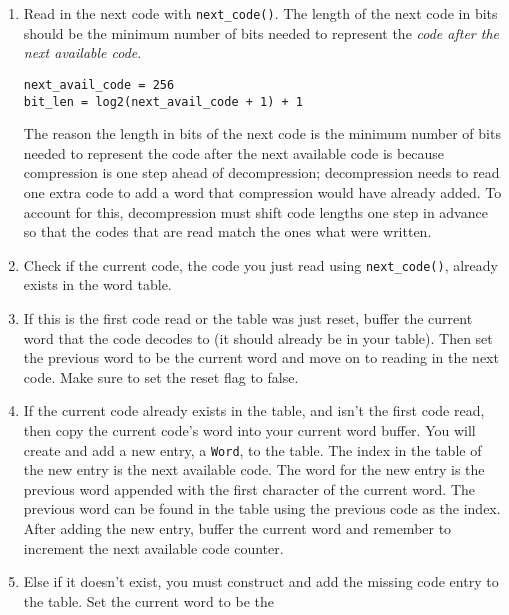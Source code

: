 \documentclass{article}
\begin{document}
\begin{enumerate}
\begin{enumerate}
            \item Read in the next code with \texttt{next\_code()}. The length
                of the next code in bits should be the minimum number of bits
                needed to represent the
                \emph{code after the next available code}.
\begin{lstlisting}
next_avail_code = 256
bit_len = log2(next_avail_code + 1) + 1
\end{lstlisting}
                The reason the length in bits of the next code is the minimum
                number of bits needed to represent the code after the next
                available code is because compression is one step ahead of
                decompression; decompression needs to read one extra code to add
                a word that compression would have already added. To account
                for this, decompression must shift code lengths one step in
                advance so that the codes that are read match the ones what were
                written.
            \item Check if the current code, the code you just read using
                \texttt{next\_code()}, already exists in the word table.
            \item If this is the first code read or the table was just reset,
                buffer the current word that the code decodes to (it should
                already be in your table). Then set the previous word to be the
                current word and move on to reading in the next code. Make sure
                to set the reset flag to false.
            \item If the current code already exists in the table, and
                isn't the first code read, then copy the current code's word
                into your current word buffer. You will create and add a new
                entry, a \texttt{Word}, to the table. The index in the table of
                the new entry is the next available code. The word for the new
                entry is the previous word appended with the first character of
                the current word. The previous word can be found in the table
                using the previous code as the index. After adding the new
                entry, buffer the current word and remember to increment the
                next available code counter.
            \item Else if it doesn't exist, you must construct and add the
                missing code entry to the table. Set the current word to be the

\end{enumerate}
\end{enumerate}
\end{document}
